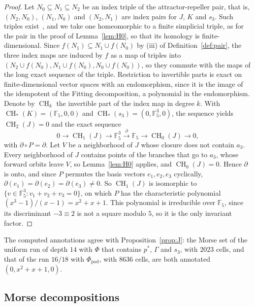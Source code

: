 \documentclass[11pt]{article}
\theoremstyle{plain}
\theoremstyle{definition}
\theoremstyle{remark}
\DeclareMathOperator{\CH}{CH}
\newcommand{\F}{\mathbb{F}_5}
\newcommand{\Phipad}{\Phi_{\mathrm{pad}}}
\begin{document}
\begin{proof}
Let $N_0\subseteq N_1\subseteq N_2$ be an index triple of the attractor-repeller pair, that is, $(N_2,N_0)$, $(N_1,N_0)$ and $(N_2,N_1)$ are index pairs for $J$, $K$ and $s_3$. Such triples exist~\cite{FR00}, and we take one homeomorphic to a finite simplicial triple, as for the pair in the proof of Lemma~\ref{lem:H0}, so that its homology is finite-dimensional. Since $f(N_1)\subseteq N_1\cup f(N_0)$ by (iii) of Definition~\ref{def:pair}, the three index maps are induced by $f$ as a map of triples into $(N_2\cup f(N_0),N_1\cup f(N_0),N_0\cup f(N_0))$, so they commute with the maps of the long exact sequence of the triple. Restriction to invertible parts is exact on finite-dimensional vector spaces with an endomorphism, since it is the image of the idempotent of the Fitting decomposition, a polynomial in the endomorphism. Denote by $\CH_k$ the invertible part of the index map in degree $k$. With $\CH_*(K)=(\F,0,0)$ and $\CH_*(s_3)=(0,\F^3,0)$, the sequence yields $\CH_2(J)=0$ and the exact sequence
\[
0\to\CH_1(J)\to\F^3\xrightarrow{\ \partial\ }\F\to\CH_0(J)\to0,
\]
with $\partial\circ P=\partial$. Let $V$ be a neighborhood of $J$ whose closure does not contain $a_3$. Every neighborhood of $J$ contains points of the branches that go to $a_3$, whose forward orbits leave $V$, so Lemma~\ref{lem:H0} applies, and $\CH_0(J)=0$. Hence $\partial$ is onto, and since $P$ permutes the basis vectors $e_1,e_2,e_3$ cyclically, $\partial(e_1)=\partial(e_2)=\partial(e_3)\neq0$. So $\CH_1(J)$ is isomorphic to $\{v\in\F^3:v_1+v_2+v_3=0\}$, on which $P$ has the characteristic polynomial $(x^3-1)/(x-1)=x^2+x+1$. This polynomial is irreducible over $\F$, since its discriminant $-3\equiv2$ is not a square modulo $5$, so it is the only invariant factor.
\end{proof}

The computed annotations agree with Proposition~\ref{prop:J}: the Morse set of the uniform run of depth $14$ with $\Phi$ that contains $p^*$, $\Gamma$ and $s_3$, with $2023$ cells, and that of the run $16/18$ with $\Phipad$, with $8636$ cells, are both annotated $(0,x^2+x+1,0)$.

\subsection{Morse decompositions}\label{sec:morse}
\end{document}
